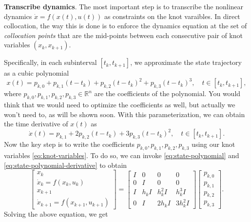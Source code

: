 \documentclass[
]{book}
\theoremstyle{definition}
\theoremstyle{definition}
\theoremstyle{definition}
\theoremstyle{definition}
\theoremstyle{remark}
\begin{document}
\textbf{Transcribe dynamics}. The most important step is to transcribe the nonlinear dynamics \(\dot{x}=f(x(t),u(t))\) as constraints on the knot varaibles. In direct collocation, the way this is done is to enforce the dynamics equation at the set of \emph{collocation points} that are the mid-points between each consecutive pair of knot variables \((x_k, x_{k+1})\).

Specifically, in each subinterval \([t_k, t_{k+1}]\), we approximate the state trajectory as a cubic polynomial
\begin{equation}
x(t) = p_{k,0} + p_{k,1}(t-t_k) + p_{k,2}(t-t_k)^2 + p_{k,3}(t - t_k)^3, \quad t \in [t_k, t_{k+1}],
\label{eq:state-polynomial}
\end{equation}
where \(p_{k,0},p_{k,1},p_{k,2},p_{k,3} \in \mathbb{R}^n\) are the coefficients of the polynomial. You would think that we would need to optimize the coefficients as well, but actually we won't need to, as will be shown soon.
With this parameterization, we can obtain the time derivative of \(x(t)\) as
\begin{equation}
\dot{x}(t) = p_{k,1} + 2 p_{k,2}(t-t_k) + 3p_{k,3}(t - t_k)^2, \quad t \in [t_k, t_{k+1}].
\label{eq:state-polynomial-derivative}
\end{equation}
Now the key step is to write the coefficients \(p_{k,0},p_{k,1},p_{k,2},p_{k,3}\) using our knot variables \eqref{eq:knot-variables}. To do so, we can invoke \eqref{eq:state-polynomial} and \eqref{eq:state-polynomial-derivative} to obtain
\[
\begin{bmatrix}
x_k \\
\dot{x}_k = f(x_k,u_k) \\
x_{k+1} \\
\dot{x}_{k+1} = f(x_{k+1}, u_{k+1})
\end{bmatrix}
= \begin{bmatrix}
I & 0 & 0 & 0 \\
0 & I & 0 & 0 \\
I & h_k I & h_k^2 I & h_k^3 I \\
0 & I & 2 h_k I & 3 h_k^2 I \end{bmatrix}
\begin{bmatrix}
p_{k,0}\\
p_{k,1}\\
p_{k,2}\\
p_{k,3}
\end{bmatrix}.
\]
Solving the above equation, we get
\end{document}
